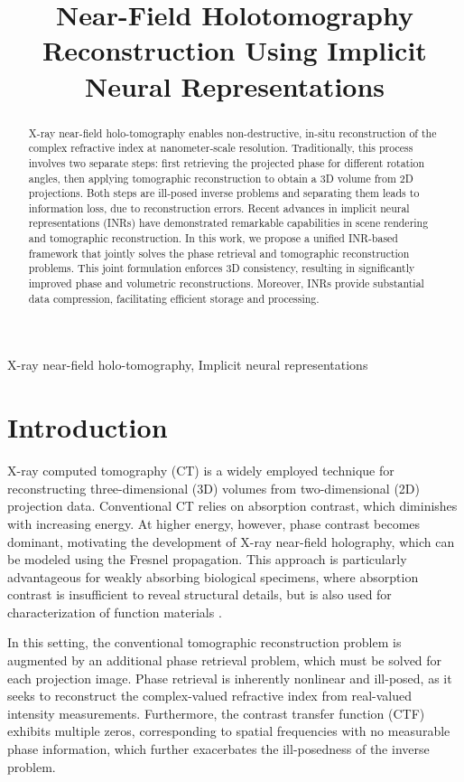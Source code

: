 \documentclass{article}
\title{Near-Field Holotomography Reconstruction Using Implicit Neural Representations}
\begin{document}
%
\maketitle
%
\begin{abstract}
X-ray near-field holo-tomography enables non-destructive, in-situ reconstruction of the complex refractive index at nanometer-scale resolution.
Traditionally, this process involves two separate steps: first retrieving the projected phase for different rotation angles, then applying tomographic reconstruction to obtain a 3D volume from 2D projections.
Both steps are ill-posed inverse problems and separating them leads to information loss, due to reconstruction errors.
Recent advances in implicit neural representations (INRs) have demonstrated remarkable capabilities in scene rendering and tomographic reconstruction.
In this work, we propose a unified INR-based framework that jointly solves the phase retrieval and tomographic reconstruction problems.
This joint formulation enforces 3D consistency, resulting in significantly improved phase and volumetric reconstructions.
Moreover, INRs provide substantial data compression, facilitating efficient storage and processing.
\end{abstract}
%
\begin{keywords}
X-ray near-field holo-tomography, Implicit neural representations
\end{keywords}
%
\section{Introduction}
\label{sec:intro}
X-ray computed tomography (CT) is a widely employed technique for reconstructing three-dimensional (3D) volumes from two-dimensional (2D) projection data.
Conventional CT relies on absorption contrast, which diminishes with increasing energy. 
At higher energy, however, phase contrast becomes dominant, motivating the development of X-ray near-field holography, which can be modeled using the Fresnel propagation.
This approach is particularly advantageous for weakly absorbing biological specimens, where absorption contrast is insufficient to reveal structural details, but is also used for characterization of function materials \cite{vesely3DXrayNanotomography2021a,flennerHardXrayNanoholotomography2020b,gerhardtThreedimensionalArchitectureLinearized2025,reimersDevelopmentBioreactorCoupledFlowCell2023}.

In this setting, the conventional tomographic reconstruction problem is augmented by an additional phase retrieval problem, which must be solved for each projection image.
Phase retrieval is inherently nonlinear and ill-posed, as it seeks to reconstruct the complex-valued refractive index from real-valued intensity measurements.
Furthermore, the contrast transfer function (CTF) exhibits multiple zeros, corresponding to spatial frequencies with no measurable phase information, which further exacerbates the ill-posedness of the inverse problem.
\end{document}
